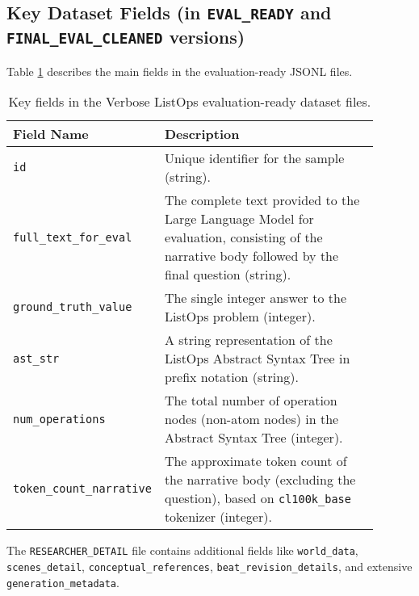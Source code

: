 \documentclass{article}
\begin{document}
\subsection{Key Dataset Fields (in \texttt{EVAL\_READY} and \texttt{FINAL\_EVAL\_CLEANED} versions)}
Table \ref{tab:appendix_dataset_fields} describes the main fields in the evaluation-ready JSONL files.
\begin{table}[h!]
  \centering
  \caption{Key fields in the Verbose ListOps evaluation-ready dataset files.}
  \label{tab:appendix_dataset_fields}
  \begin{tabular}{p{0.25\linewidth} p{0.65\linewidth}}
    \toprule
    \textbf{Field Name}              & \textbf{Description}                                                                                                                             \\
    \midrule
    \texttt{id}                      & Unique identifier for the sample (string).                                                                                                       \\
    \texttt{full\_text\_for\_eval}   & The complete text provided to the Large Language Model for evaluation, consisting of the narrative body followed by the final question (string). \\
    \texttt{ground\_truth\_value}    & The single integer answer to the ListOps problem (integer).                                                                                      \\
    \texttt{ast\_str}                & A string representation of the ListOps Abstract Syntax Tree in prefix notation (string).                                                         \\
    \texttt{num\_operations}         & The total number of operation nodes (non-atom nodes) in the Abstract Syntax Tree (integer).                                                      \\
    \texttt{token\_count\_narrative} & The approximate token count of the narrative body (excluding the question), based on \texttt{cl100k\_base} tokenizer (integer).                  \\
    \bottomrule
  \end{tabular}
\end{table}
The \texttt{RESEARCHER\_DETAIL} file contains additional fields like \texttt{world\_data}, \texttt{scenes\_detail}, \texttt{conceptual\_references}, \texttt{beat\_revision\_details}, and extensive \texttt{generation\_metadata}.
\end{document}
